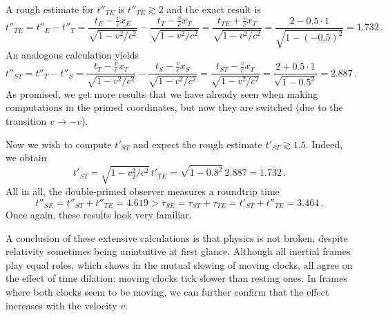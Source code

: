 \begin{ex}
\begin{itemize}
		A rough estimate for $t''_{TE}$ is $t''_{TE} \gtrsim 2$ and the exact result is
		\begin{equation*}
			t''_{TE} = t''_E - t''_T = \frac{t_E - \frac{v}{c} x_E}{\sqrt{1 - v^2 / c^2}} - \frac{t_T - \frac{v}{c} x_T}{\sqrt{1 - v^2 / c^2}} = \frac{t_{TE} + \frac{v}{c} x_T}{\sqrt{1 - v^2 / c^2}} = \frac{2 - 0.5 \cdot 1}{\sqrt{1 - (-0.5)^2}} = 1.732 \, .
		\end{equation*}
		An analogous calculation yields
		\begin{equation*}
			t''_{ST} = t''_T - t''_S = \frac{t_T - \frac{v}{c} x_T}{\sqrt{1 - v^2 / c^2}} - \frac{t_S - \frac{v}{c} x_S}{\sqrt{1 - v^2 / c^2}} = \frac{t_{ST} - \frac{v}{c} x_T}{\sqrt{1 - v^2 / c^2}} = \frac{2 + 0.5 \cdot 1}{\sqrt{1 - 0.5^2}} = 2.887 \, .
		\end{equation*}
		As promised, we get more results that we have already seen when making computations in the primed coordinates, but now they are switched (due to the transition $v \rightarrow -v$).
	
		Now we wish to compute $t'_{ST}$ and expect the rough estimate $t'_{ST} \gtrsim 1.5$. Indeed, we obtain
		\begin{equation*}
			t'_{ST} = \sqrt{1 - v_2^2 / c^2} \, t'_{TE} = \sqrt{1 - 0.8^2} \, 2.887 = 1.732 \, .
		\end{equation*}
		All in all, the double-primed observer measures a roundtrip time
		\begin{equation*}
			t''_{SE} = t''_{ST} + t''_{TE} = 4.619 > \tau_{SE} = \tau_{ST} + \tau_{TE} = t'_{ST} + t''_{TE} = 3.464 \, .
		\end{equation*}
		Once again, these results look very familiar. 
	\end{itemize}
	
	A conclusion of these extensive calculations is that physics is not broken, despite relativity sometimes being unintuitive at first glance. Although all inertial frames play equal roles, which shows in the mutual slowing of moving clocks, all agree on the effect of time dilation: moving clocks tick slower than resting ones. In frames where both clocks seem to be moving, we can further confirm that the effect increases with the velocity $v$.
	

\end{ex}
